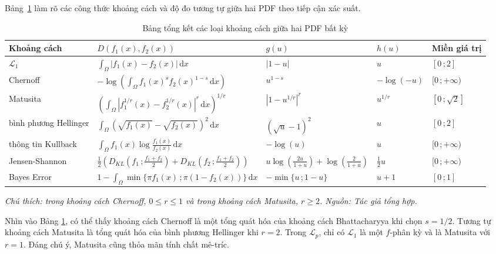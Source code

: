 \documentclass[a4paper,oneside]{book} %
\theoremstyle{plain}
\theoremstyle{plain}
\theoremstyle{nonumberplain}
\begin{document}
Bảng~\ref{tab1:KC_PDF} làm rõ các công thức khoảng cách và độ đo tương tự giữa hai PDF theo tiếp cận xác suất.
\begin{table}[H]
	\caption{Bảng tổng kết các loại khoảng cách giữa hai PDF bất kỳ}\label{tab1:KC_PDF}
	\centering\scriptsize
	\begin{tabular*}{\columnwidth}{@{\extracolsep\fill}lllll@{\extracolsep\fill}} 
		\toprule
		\bf Khoảng cách & \bf $D(f_1(x), f_2(x))$ & \bf $g(u)$ & \bf $h(u)$ & \bf Miền giá trị  \\ \midrule
		$\mathcal{L}_1$ & $\displaystyle\int_{\Omega}|f_1(x) - f_2(x)|\mathrm{\,d}x$ & $|1-u|$ & $u$ & $[0\,;2]$ \\
		Chernoff & $-\log\left(\displaystyle\int_{\Omega} f_1(x)^s f_2(x)^{1-s}\mathrm{\,d}x\right)$ & $u^{1-s}$ & $-\log(-u)$ & $[0\,;+\infty)$ \\
		Matusita & $\left(\displaystyle\int_{\Omega}\left|f_1^{1/r}(x) - f_2^{1/r}(x)\right|^r\mathrm{\,d}x\right)^{1/r}$ & $\left|1-u^{1/r}\right|^{r}$ & $u^{1/r}$ & $[0\,; \sqrt{2}]$ \\
		bình phương Hellinger & $\displaystyle\int_{\Omega}\left(\sqrt{f_1(x)}-\sqrt{f_2(x)}\right)^2\mathrm{\,d}x$ & $(\sqrt{u}-1)^2$ & $u$ & $[0\,;2]$ \\
		thông tin Kullback&$\displaystyle\int_{\Omega} f_1(x)\log\frac{f_1(x)}{f_2(x)}\mathrm{\,d}x$ & $-\log(u)$ & $u$ & $[0\,;+\infty)$ \\
		 Jensen-Shannon & $\frac{1}{2}\left(D_{KL}(f_1\,; \frac{f_1+f_2}{2}) + D_{KL}(f_2\,; \frac{f_1+f_2}{2})\right)$ & $u\log\left(\frac{2u}{1+u}\right)+\log\left(\frac{2}{1+u}\right)$ & $\frac{1}{2}u$ & $[0\,;+\infty)$ \\
	Bayes	Error &$1-\displaystyle\int_{\Omega} \min\{\pi f_1(x)\,;\pi (1-f_2(x))\}\mathrm{\,d}x$ &$-\min\{u\,;1-u\}$ & $u+1$ & $[0\,;1]$ \\
		\bottomrule
	\end{tabular*}
\begin{minipage}{\textwidth}
	\fontsize{11pt}{14pt}\selectfont\it
	Chú thích: trong khoảng cách Chernoff, $0\le r\le 1$ và trong khoảng cách Matusita, $r\ge2$. Nguồn: Tác giả tổng hợp.
\end{minipage}
\end{table}


Nhìn vào Bảng \ref{tab1:KC_PDF}, có thể thấy khoảng cách Chernoff là một tổng quát hóa của khoảng cách Bhattacharyya khi chọn $s = 1/2$. Tương tự khoảng cách Matusita là tổng quát hóa của bình phương Hellinger khi $r=2$. Trong $\mathcal{L}_p$, chỉ có $\mathcal{L}_1$ là một $f$-phân kỳ và là Matusita với $r=1$. Đáng chú ý, Matusita cũng thỏa mãn tính chất mê-tríc.
\end{document}
